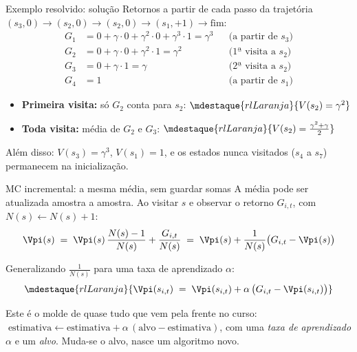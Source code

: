 \documentclass[aspectratio=169, 11pt]{beamer}
\begin{document}
\begin{frame}{Exemplo resolvido: solução}
  Retornos a partir de cada passo da trajetória
  $(s_3, 0)\!\to\!(s_2, 0)\!\to\!(s_2, 0)\!\to\!(s_1, +1)\!\to\!\text{fim}$:
  \begin{align*}
    G_{1} &= 0 + \gamma\cdot 0 + \gamma^2\cdot 0 + \gamma^3\cdot 1 = \gamma^3
      && \text{(a partir de $s_3$)}\\
    G_{2} &= 0 + \gamma\cdot 0 + \gamma^2\cdot 1 = \gamma^2
      && \text{(1ª visita a $s_2$)}\\
    G_{3} &= 0 + \gamma\cdot 1 = \gamma
      && \text{(2ª visita a $s_2$)}\\
    G_{4} &= 1 && \text{(a partir de $s_1$)}
  \end{align*}

  \begin{itemize}
    \item \textbf{Primeira visita:} só $G_2$ conta para $s_2$:\quad
      $\mdestaque{rlLaranja}{V(s_2) = \gamma^2}$
    \item \textbf{Toda visita:} média de $G_2$ e $G_3$:\quad
      $\mdestaque{rlLaranja}{V(s_2) = \tfrac{\gamma^2 + \gamma}{2}}$
  \end{itemize}

  \medskip
  Além disso: $V(s_3) = \gamma^3$, $V(s_1) = 1$, e os estados nunca
  visitados ($s_4$ a $s_7$) permanecem na inicialização.
\end{frame}

\begin{frame}{MC incremental: a mesma média, sem guardar somas}
  A média pode ser atualizada amostra a amostra. Ao visitar $s$ e observar
  o retorno $G_{i,t}$, com $N(s) \leftarrow N(s)+1$:
  \[
    \Vpi(s) \;=\; \Vpi(s)\,\frac{N(s)-1}{N(s)} + \frac{G_{i,t}}{N(s)}
    \;=\; \Vpi(s) + \frac{1}{N(s)}\bigl(G_{i,t} - \Vpi(s)\bigr)
  \]

  Generalizando $\tfrac{1}{N(s)}$ para uma taxa de aprendizado $\alpha$:
  \[
    \mdestaque{rlLaranja}{\Vpi(s_{i,t}) \;=\; \Vpi(s_{i,t})
      + \alpha\,\bigl(G_{i,t} - \Vpi(s_{i,t})\bigr)}
  \]

  \begin{ideiabox}
    Este é o molde de quase tudo que vem pela frente no curso:
    $\;\text{estimativa} \leftarrow \text{estimativa}
      + \alpha\,(\text{alvo} - \text{estimativa})$,
    com uma \emph{taxa de aprendizado} $\alpha$ e um \emph{alvo}.
    Muda-se o alvo, nasce um algoritmo novo.
  \end{ideiabox}
\end{frame}
\end{document}
